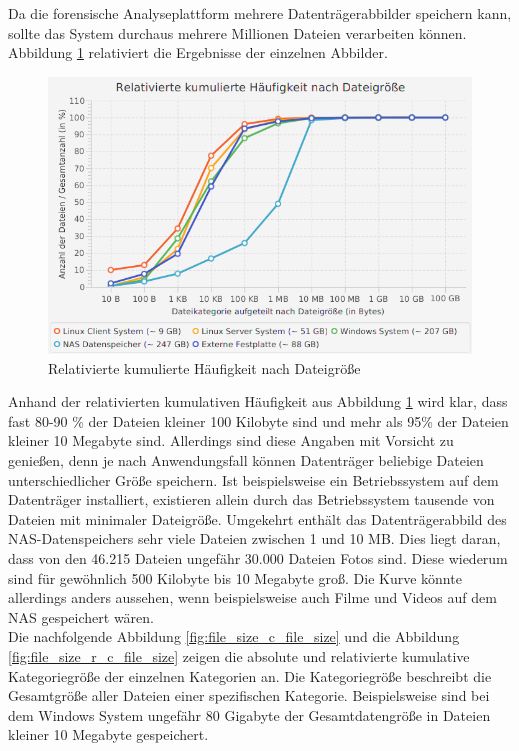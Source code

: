 \noindent
Da die forensische Analyseplattform mehrere Datenträgerabbilder speichern kann, sollte das System durchaus mehrere Millionen Dateien verarbeiten können. Abbildung \ref{fig:file_size_r_c_amount} relativiert die Ergebnisse der einzelnen Abbilder.\\

 \begin{figure}[ht]
  \centering
  \includegraphics[width=\textwidth]{./resource/fileSize_relativeCumulatedAmount.png}
  \caption{Relativierte kumulierte Häufigkeit nach Dateigröße}
  \label{fig:file_size_r_c_amount}
\end{figure}

\noindent
Anhand der relativierten kumulativen Häufigkeit aus Abbildung \ref{fig:file_size_r_c_amount} wird klar, dass fast 80-90 \% der Dateien kleiner 100 Kilobyte sind und mehr als 95\% der Dateien kleiner 10 Megabyte sind. Allerdings sind diese Angaben mit Vorsicht zu genießen, denn je nach Anwendungsfall können Datenträger beliebige Dateien unterschiedlicher Größe speichern. Ist beispielsweise ein Betriebssystem auf dem Datenträger installiert, existieren allein durch das Betriebssystem tausende von Dateien mit minimaler Dateigröße. Umgekehrt enthält das Datenträgerabbild des NAS-Datenspeichers sehr viele Dateien zwischen 1 und 10 MB. Dies liegt daran, dass von den 46.215 Dateien ungefähr 30.000 Dateien Fotos sind. Diese wiederum sind für gewöhnlich 500 Kilobyte bis 10 Megabyte groß. Die Kurve könnte allerdings anders aussehen, wenn beispielsweise auch Filme und Videos auf dem NAS gespeichert wären.\\

\noindent
Die nachfolgende Abbildung \ref{fig:file_size_c_file_size} und die Abbildung \ref{fig:file_size_r_c_file_size} zeigen die absolute und relativierte kumulative Kategoriegröße der einzelnen Kategorien an. Die Kategoriegröße beschreibt die Gesamtgröße aller Dateien einer spezifischen Kategorie. Beispielsweise sind bei dem Windows System ungefähr 80 Gigabyte der Gesamtdatengröße in Dateien kleiner 10 Megabyte gespeichert.\\  

